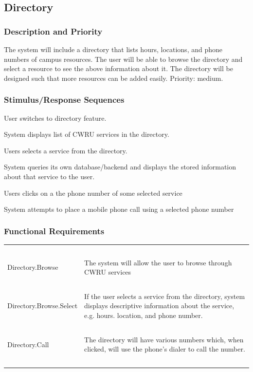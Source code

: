 \documentclass[pdftex,12pt,letter]{article}
\begin{document}
\subsection{Directory}
\subsubsection{Description and Priority}
The system will include a directory that lists hours, locations, and phone numbers of campus resources. The user will be able to browse the directory and select a resource to see the above information about it. The directory will be designed such that more resources can be added easily. Priority: medium.
\subsubsection{Stimulus/Response Sequences}
\begin{description}\itemsep1pt
\item[Stimulus:] User switches to directory feature.
\item[Response:] System displays list of CWRU services in the directory.
\item[Stimulus:] Users selects a service from the directory.
\item[Response:] System queries its own database/backend and displays the stored information about that service to the user.
\item[Stimulus:] Users clicks on a the phone number of some selected service
\item[Response:] System attempts to place a mobile phone call using a selected phone number
\end{description}
\subsubsection{Functional Requirements}
\begin{table}[!h]
\begin{tabularx}{\textwidth }[t]{|l Y|}
\hline
~&~\\
Directory.Browse & The system will allow the user to browse through CWRU services\\ 
~&~\\
Directory.Browse.Select & If the user selects a service from the directory, system displays descriptive information about the service, e.g. hours. location, and phone number.\\
~&~\\
Directory.Call & The directory will have various numbers which, when clicked, will use the phone's dialer to call the number.\\
~&~\\
\hline
\end{tabularx}
\end{table}
\FloatBarrier
\end{document}
